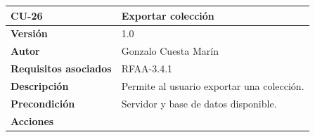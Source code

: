 \documentclass[
]{article}
\begin{document}
\begin{longtable}[]{@{}ll@{}}
\toprule
\begin{minipage}[b]{0.26\columnwidth}\raggedright
\textbf{CU-26}\strut
\end{minipage} & \begin{minipage}[b]{0.68\columnwidth}\raggedright
\textbf{Exportar colección}\strut
\end{minipage}\tabularnewline
\midrule
\endhead
\begin{minipage}[t]{0.26\columnwidth}\raggedright
\textbf{Versión}\strut
\end{minipage} & \begin{minipage}[t]{0.68\columnwidth}\raggedright
1.0\strut
\end{minipage}\tabularnewline
\begin{minipage}[t]{0.26\columnwidth}\raggedright
\textbf{Autor}\strut
\end{minipage} & \begin{minipage}[t]{0.68\columnwidth}\raggedright
Gonzalo Cuesta Marín\strut
\end{minipage}\tabularnewline
\begin{minipage}[t]{0.26\columnwidth}\raggedright
\textbf{Requisitos asociados}\strut
\end{minipage} & \begin{minipage}[t]{0.68\columnwidth}\raggedright
RFAA-3.4.1\strut
\end{minipage}\tabularnewline
\begin{minipage}[t]{0.26\columnwidth}\raggedright
\textbf{Descripción}\strut
\end{minipage} & \begin{minipage}[t]{0.68\columnwidth}\raggedright
Permite al usuario exportar una colección.\strut
\end{minipage}\tabularnewline
\begin{minipage}[t]{0.26\columnwidth}\raggedright
\textbf{Precondición}\strut
\end{minipage} & \begin{minipage}[t]{0.68\columnwidth}\raggedright
Servidor y base de datos disponible.\strut
\end{minipage}\tabularnewline
\begin{minipage}[t]{0.26\columnwidth}\raggedright
\textbf{Acciones}\strut
\end{minipage} & \begin{minipage}[t]{0.68\columnwidth}\raggedright
\begin{enumerate}
\def\labelenumi{\arabic{enumi}.}

\end{enumerate}
\end{minipage}
\end{longtable}
\end{document}
